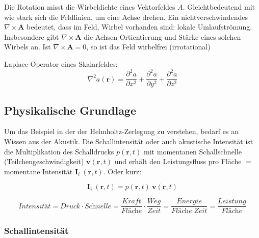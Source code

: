 Die Rotation misst die Wirbeldichte eines Vektorfeldes $A$. Gleichtbedeutend mit wie stark sich die Feldlinien, um eine Achse drehen. Ein nichtverschwindendes $\nabla\times \mathbf{A}$ bedeutet, dass im Feld, Wirbel vorhanden sind: lokale Umlaufströmung. Insbesondere gibt $\nabla\times \mathbf{A}$ die Achsen-Ortientierung und Stärke eines solchen Wirbels an. Ist $\nabla\times \mathbf{A}=0$, so ist das Feld wirbelfrei (irrotational) \newline


Laplace-Operator eines Skalarfeldes:
\begin{equation}
\nabla^2 a(\mathbf{r}) = \frac{\partial^2 a}{\partial x^2} + \frac{\partial^2 a}{\partial y^2} + \frac{\partial^2 a}{\partial z^2}
\end{equation}


\subsection{Physikalische Grundlage}

Um das Beispiel in der der Helmholtz-Zerlegung zu verstehen, bedarf es an Wissen aus der Akustik. Die Schallintensität oder auch akustische Intensität ist die Multiplikation des Schalldrucks $ p(\mathbf{r},t)$ mit momentanen Schallschnelle (Teilchengeschwindigkeit) $\mathbf{v}(\mathbf{r},t)$ und erhält den Leistungsfluss pro Fläche $=$ momentane Intensität $\mathbf{I}_i ~(\mathbf{r},t)$. Oder kurz:

	\begin{equation}
\mathbf{I}_i ~(\mathbf{r},t) = p(\mathbf{r},t)~\mathbf{v}(\mathbf{r},t)
	\label{helmholtz:equationIntensitaetMomentan}
	\end{equation}

\begin{equation}
\textit{Intensität} = \textit{Druck} \cdot \textit{Schnelle}=\frac{\textit{Kraft}}{\textit{Fläche}} \cdot \frac{\textit{Weg}}{\textit{Zeit}} = \frac{\textit{Energie}}{\textit{Fläche}\cdot \textit{Zeit}} = \frac{\textit{Leistung}}{\textit{Fläche}}
\label{helmholtz:equationIntensitaetPseudoDef}
\end{equation}

\subsubsection{Schallintensität}

